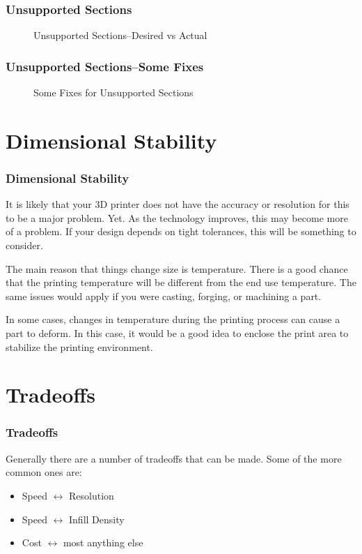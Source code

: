 \documentclass[english,10pt]{beamer}
\begin{document}
\begin{frame}
  \frametitle{Unsupported Sections}
  \begin{figure}
    
    \caption{Unsupported Sections--Desired vs Actual}
  \end{figure}
\end{frame}

\begin{frame}
  \frametitle{Unsupported Sections--Some Fixes}
  \begin{figure}
    
    \caption{Some Fixes for Unsupported Sections}
  \end{figure}
\end{frame}

\section{Dimensional Stability}
\begin{frame}
  \frametitle{Dimensional Stability}
  It is likely that your 3D printer does not have the accuracy or resolution for this to be a major problem.  Yet.  As the technology improves, this may become more of a problem.  If your design depends on tight tolerances, this will be something to consider.
  
  The main reason that things change size is temperature.  There is a good chance that the printing temperature will be different from the end use temperature.  The same issues would apply if you were casting, forging, or machining a part.
  
  In some cases, changes in temperature during the printing process can cause a part to deform.  In this case, it would be a good idea to enclose the print area to stabilize the printing environment.
\end{frame}

\section{Tradeoffs}
\begin{frame}
  \frametitle{Tradeoffs}
  Generally there are a number of tradeoffs that can be made.  Some of the more common ones are:
  \begin{itemize}
    \item Speed $\leftrightarrow$ Resolution
    \item Speed $\leftrightarrow$ Infill Density
    \item Cost $\leftrightarrow$ most anything else
  \end{itemize}
\end{frame}
\end{document}
